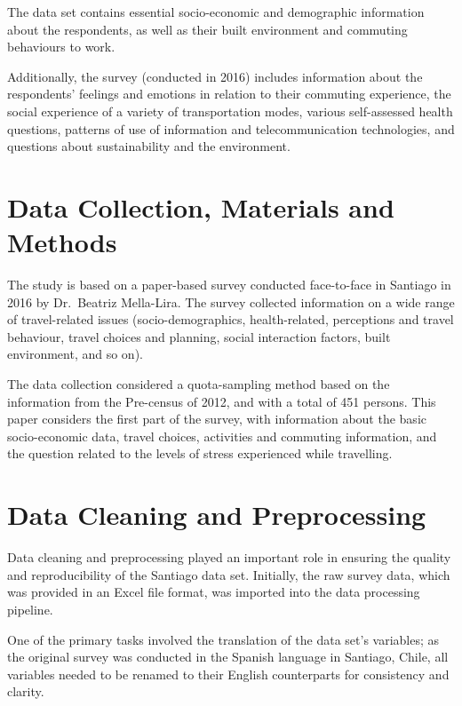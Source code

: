 \documentclass[
11pt, %
oneside, %
english, %
singlespacing, %
]{macthesis} %
\begin{document}
The data set contains essential socio-economic and demographic information about the respondents, as well as their built environment and commuting behaviours to work.

Additionally, the survey (conducted in 2016) includes information about the respondents' feelings and emotions in relation to their commuting experience, the social experience of a variety of transportation modes, various self-assessed health questions, patterns of use of information and telecommunication technologies, and questions about sustainability and the environment.

\hypertarget{data-collection-materials-and-methods}{%
\section{Data Collection, Materials and Methods}\label{data-collection-materials-and-methods}}

The study is based on a paper-based survey conducted face-to-face in Santiago in 2016 by Dr.~Beatriz Mella-Lira. The survey collected information on a wide range of travel-related issues (socio-demographics, health-related, perceptions and travel behaviour, travel choices and planning, social interaction factors, built environment, and so on).

The data collection considered a quota-sampling method based on the information from the Pre-census of 2012, and with a total of 451 persons. This paper considers the first part of the survey, with information about the basic socio-economic data, travel choices, activities and commuting information, and the question related to the levels of stress experienced while travelling.

\hypertarget{data-cleaning-and-preprocessing}{%
\section{Data Cleaning and Preprocessing}\label{data-cleaning-and-preprocessing}}

Data cleaning and preprocessing played an important role in ensuring the quality and reproducibility of the Santiago data set. Initially, the raw survey data, which was provided in an Excel file format, was imported into the data processing pipeline.

One of the primary tasks involved the translation of the data set's variables; as the original survey was conducted in the Spanish language in Santiago, Chile, all variables needed to be renamed to their English counterparts for consistency and clarity.
\end{document}
